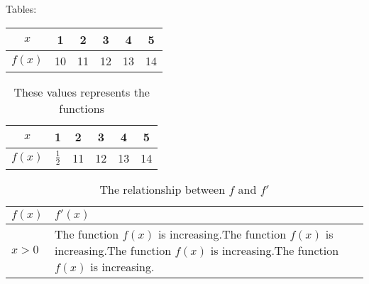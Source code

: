 \documentclass[11pt]{article}
\begin{document}
Tables:\\
\begin{tabular}{|c||c|c|c|c|c|} \hline
$x$ & 1 & 2 & 3 & 4 & 5\\ \hline
$f(x)$&10&11&12&13&14\\ \hline
\end{tabular}

\vspace{1cm}

\begin{table}[H]

\centering

\def\arraystretch{1.5} %
\begin{tabular}{|c||c|c|c|c|c|} \hline
$x$ & 1 & 2 & 3 & 4 & 5\\ \hline
$f(x)$&$\frac{1}{2}$&11&12&13&14\\ \hline
\end{tabular}

\caption{These values represents the functions}

\end{table}


\begin{table}[H]

\centering
\caption{The relationship between $f$ and $f'$} 
\def\arraystretch{1.5} %
\begin{tabular}{|l|p{3in}|} \hline %
$f(x)$ & $f'(x)$\\ \hline
$x>0$& The function $f(x)$ is increasing.The function $f(x)$ is increasing.The function $f(x)$ is increasing.The function $f(x)$ is increasing.\\ \hline
\end{tabular}



\end{table}
\end{document}
